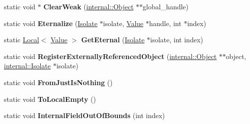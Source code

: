 \begin{DoxyCompactItemize}
\item 
static void $\ast$ {\bfseries Clear\+Weak} (\hyperlink{classv8_1_1internal_1_1_object}{internal\+::\+Object} $\ast$$\ast$global\+\_\+handle)\hypertarget{classv8_1_1_v8_ae1d9db73c8850ab48ff30383b3d17545}{}\label{classv8_1_1_v8_ae1d9db73c8850ab48ff30383b3d17545}

\item 
static void {\bfseries Eternalize} (\hyperlink{classv8_1_1_isolate}{Isolate} $\ast$isolate, \hyperlink{classv8_1_1_value}{Value} $\ast$handle, int $\ast$index)\hypertarget{classv8_1_1_v8_a1bf5b4bab05d472c151adc03e3d3ccf4}{}\label{classv8_1_1_v8_a1bf5b4bab05d472c151adc03e3d3ccf4}

\item 
static \hyperlink{classv8_1_1_local}{Local}$<$ \hyperlink{classv8_1_1_value}{Value} $>$ {\bfseries Get\+Eternal} (\hyperlink{classv8_1_1_isolate}{Isolate} $\ast$isolate, int index)\hypertarget{classv8_1_1_v8_a085766f9b0aeef7a923a60db760679f6}{}\label{classv8_1_1_v8_a085766f9b0aeef7a923a60db760679f6}

\item 
static void {\bfseries Register\+Externally\+Referenced\+Object} (\hyperlink{classv8_1_1internal_1_1_object}{internal\+::\+Object} $\ast$$\ast$object, \hyperlink{classv8_1_1internal_1_1_isolate}{internal\+::\+Isolate} $\ast$isolate)\hypertarget{classv8_1_1_v8_ace7474e090464eb921d8270ace9e0627}{}\label{classv8_1_1_v8_ace7474e090464eb921d8270ace9e0627}

\item 
static void {\bfseries From\+Just\+Is\+Nothing} ()\hypertarget{classv8_1_1_v8_ac0a863184497b3dc168a7a06998100c9}{}\label{classv8_1_1_v8_ac0a863184497b3dc168a7a06998100c9}

\item 
static void {\bfseries To\+Local\+Empty} ()\hypertarget{classv8_1_1_v8_af88f0c5a29f42bc9f17853de44366664}{}\label{classv8_1_1_v8_af88f0c5a29f42bc9f17853de44366664}

\item 
static void {\bfseries Internal\+Field\+Out\+Of\+Bounds} (int index)\hypertarget{classv8_1_1_v8_a1efed9c11747a31dd97c59a77217f0e4}{}\label{classv8_1_1_v8_a1efed9c11747a31dd97c59a77217f0e4}

\end{DoxyCompactItemize}
